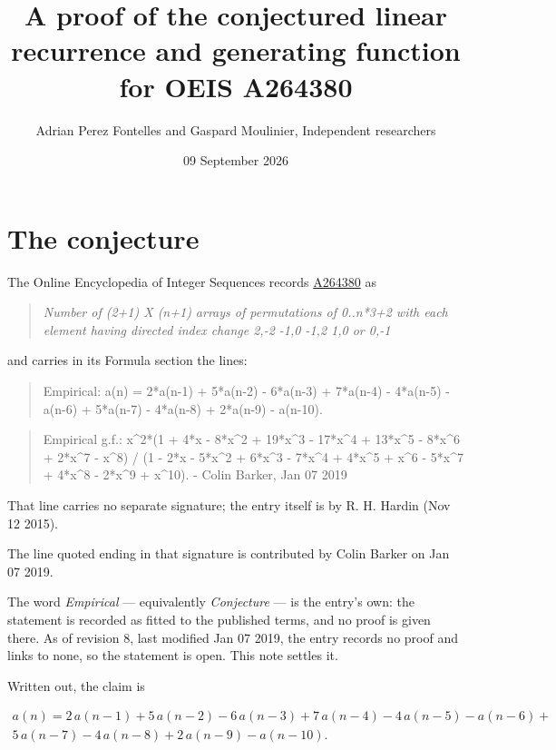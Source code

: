 \documentclass[11pt]{article}
\title{A proof of the conjectured linear recurrence and generating function for OEIS A264380}
\author{Adrian Perez Fontelles and Gaspard Moulinier, Independent researchers}
\date{09 September 2026}
\theoremstyle{definition}
\begin{document}
\maketitle
\section{The conjecture}

The Online Encyclopedia of Integer Sequences records \href{https://oeis.org/A264380}{A264380} as

\begin{quote}\itshape Number of (2+1) X (n+1) arrays of permutations of 0..n*3+2 with each element having directed index change 2,-2 -1,0 -1,2 1,0 or 0,-1\end{quote}

and carries in its Formula section the lines:

\begin{quote}\ttfamily Empirical: a(n) = 2*a(n-1) + 5*a(n-2) - 6*a(n-3) + 7*a(n-4) - 4*a(n-5) - a(n-6) + 5*a(n-7) - 4*a(n-8) + 2*a(n-9) - a(n-10).\end{quote}

\begin{quote}\ttfamily Empirical g.f.: x\textasciicircum{}2*(1 + 4*x - 8*x\textasciicircum{}2 + 19*x\textasciicircum{}3 - 17*x\textasciicircum{}4 + 13*x\textasciicircum{}5 - 8*x\textasciicircum{}6 + 2*x\textasciicircum{}7 - x\textasciicircum{}8) / (1 - 2*x - 5*x\textasciicircum{}2 + 6*x\textasciicircum{}3 - 7*x\textasciicircum{}4 + 4*x\textasciicircum{}5 + x\textasciicircum{}6 - 5*x\textasciicircum{}7 + 4*x\textasciicircum{}8 - 2*x\textasciicircum{}9 + x\textasciicircum{}10). - Colin Barker, Jan 07 2019\end{quote}

That line carries no separate signature; the entry itself is by R. H. Hardin (Nov 12 2015).

The line quoted ending in that signature is contributed by Colin Barker on Jan 07 2019.

The word {\itshape Empirical} --- equivalently {\itshape Conjecture} --- is the entry's own: the statement is recorded as fitted to the published terms, and no proof is given there. As of revision 8, last modified Jan 07 2019, the entry records no proof and links to none, so the statement is open. This note settles it.

Written out, the claim is

\begin{multline*} a(n) = 2\,a(n-1) + 5\,a(n-2) - 6\,a(n-3) + 7\,a(n-4) - 4\,a(n-5) - a(n-6) + \\ 5\,a(n-7) - 4\,a(n-8) + 2\,a(n-9) - a(n-10). \end{multline*}
\end{document}
